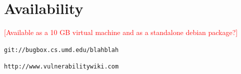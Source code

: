 \documentclass[letterpaper,twocolumn,10pt]{article}
\begin{document}
\section{Availability}
\textcolor{red}{
[Available as a 10 GB virtual machine and as a standalone debian package?]
}
\begin{center}
{\tt git://bugbox.cs.umd.edu/blahblah}
\end{center}

\begin{center}
{\tt http://www.vulnerabilitywiki.com}
\end{center}

{\footnotesize 
}
\end{document}
